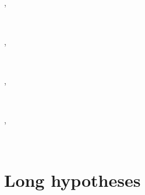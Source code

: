 \documentclass[a4paper]{article}
\begin{document}
\begin{alectryon}
\begin{sentence}
    \begin{input}
      ~\PY{o}{?[}\PY{o}{].}\nl
    \end{input}
  \end{sentence}
  \sep
  \begin{sentence}
    \begin{input}
      ~~~~\PY{o}{[}\PY{o}{]:}~\nl
    \end{input}
  \end{sentence}
  \sep
  \begin{sentence}
    \begin{input}
      ~~~~~\nl
    \end{input}
  \end{sentence}
  \sep
  \begin{sentence}
    \begin{input}
      ~~\nl
    \end{input}
  \end{sentence}
  \sep
  \begin{sentence}
    \begin{input}
      ~
    \end{input}
  \end{sentence}
\end{alectryon}


\section{Long hypotheses%
  \label{long-hypotheses}%
}
\end{document}
